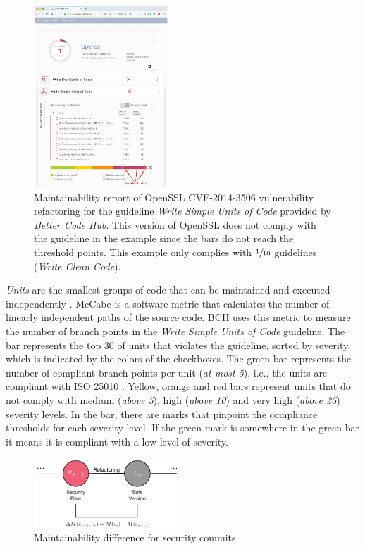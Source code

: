 \documentclass[10pt,conference]{IEEEtran}
\begin{document}
\begin{figure}[h]
 	\centering 	\includegraphics[width=0.45\textwidth]{figures/bch_report.png}
 	\caption{Maintainability report of OpenSSL CVE-2014-3506 vulnerability
refactoring for the guideline \emph{Write Simple Units of Code} provided by
\emph{Better Code Hub}. This version of OpenSSL does not comply with the
guideline in the example since the bars do not reach the threshold points. This
example only complies with $\sfrac{1}{10}$ guidelines (\emph{Write Clean Code}).}
	\label{fig:bchrep}
\end{figure}

\emph{Units} are the smallest groups of code that can be maintained and executed
independently \cite{Visser:2016:OREILLY}. McCabe \cite{1702388} is a software
metric that calculates the number of linearly independent paths of the source
code. BCH uses this metric to measure the number of branch points in the
\emph{Write Simple Units of Code} guideline. The bar represents the top 30 of
units that violates the guideline, sorted by severity, which is indicated by the
colors of the checkboxes. The green bar represents the number of compliant
branch points per unit (\emph{at most 5}), i.e., the units are compliant with
ISO 25010 \cite{iso:2011}. Yellow, orange and red bars represent units that do
not comply with medium (\emph{above 5}), high (\emph{above 10}) and very high
(\emph{above 25}) severity levels. In the bar, there are marks that pinpoint the
compliance thresholds for each severity level. If the green mark is somewhere
in the green bar it means it is compliant with a low level of severity.

\begin{figure}[h]
 	\centering 	\includegraphics[width=0.49\textwidth]{figures/commit.pdf}
 	\caption{Maintainability difference for security commits}
	\label{fig:commit}
\end{figure}
\end{document}
